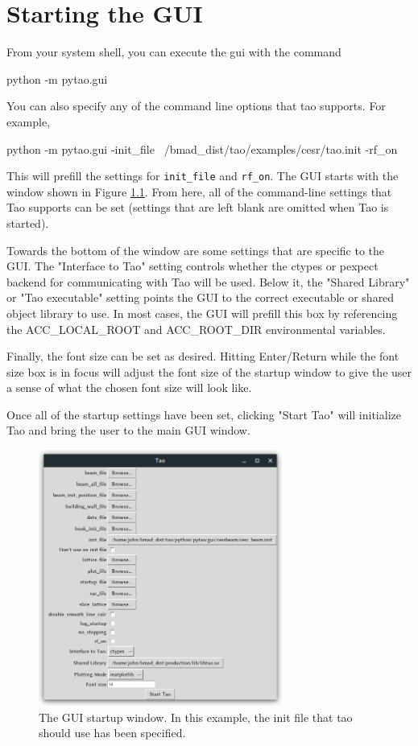\chapter{Starting the GUI}
\label{s:gui.startup}

From your system shell, you can execute the gui with the command
\begin{example}
  python -m pytao.gui
\end{example}
You can also specify any of the command line options that tao supports.  For example,
\begin{example}
  python -m pytao.gui -init_file ~/bmad_dist/tao/examples/cesr/tao.init -rf_on
\end{example}
This will prefill the settings for \texttt{init_file} and \texttt{rf_on}.
The GUI starts with the window shown in Figure \ref{fig:startup}.
From here, all of the command-line settings that Tao supports can be set (settings that are left blank are omitted when Tao is started).

Towards the bottom of the window are some settings that are specific to the GUI.  The "Interface to Tao" setting controls whether the ctypes or pexpect backend for communicating with Tao will be used.
Below it, the "Shared Library" or "Tao executable" setting points the GUI to the correct executable or shared object library to use.
In most cases, the GUI will prefill this box by referencing the ACC_LOCAL_ROOT and ACC_ROOT_DIR environmental variables.

Finally, the font size can be set as desired.
Hitting Enter/Return while the font size box is in focus will adjust the font size of the startup window to give the user a sense of what the chosen font size will look like.

Once all of the startup settings have been set, clicking "Start Tao" will initialize Tao and bring the user to the main GUI window.
\begin{figure}
\includegraphics[width=8cm]{figures/startup.png}
\centering
\caption{The GUI startup window.  In this example, the init file that tao should use has been specified.}
\label{fig:startup}
\end{figure}

